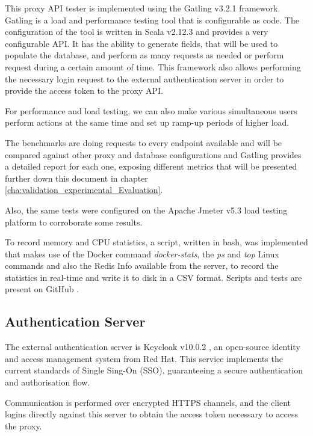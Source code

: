 This proxy \gls{API} tester is implemented using the Gatling v3.2.1 \cite{gatling:1} framework. Gatling is a load and performance testing tool that is configurable as code. The configuration of the tool is written in Scala v2.12.3 and provides a very configurable \gls{API}. It has the ability to generate fields, that will be used to populate the database, and perform as many requests as needed or perform request during a certain amount of time. This framework also allows performing the necessary login request to the external authentication server in order to provide the access token to the proxy API.

For performance and load testing, we can also make various simultaneous users perform actions at the same time and set up ramp-up periods of higher load.

The benchmarks are doing requests to every endpoint available and will be compared against other proxy and database configurations and Gatling provides a detailed report for each one, exposing different metrics that will be presented further down this document in chapter \ref{cha:validation_experimental_Evaluation}.

Also, the same tests were configured on the Apache Jmeter v5.3\cite{jmeter:1} load testing platform to corroborate some results.

To record memory and \gls{CPU} statistics, a script, written in bash, was implemented that makes use of the Docker command \textit{docker-stats}, the \textit{ps} and \textit{top} Linux commands and also the Redis Info available from the server, to record the statistics in real-time and write it to disk in a \gls{CSV} format. Scripts and tests are present on GitHub \cite{thesis-repository:client}.

\subsection{Authentication Server}
\label{ssec:implementation_authentication_server}

The external authentication server is Keycloak v10.0.2 \cite{keycloak:1}, an open-source identity and access management system from Red Hat. This service implements the current standards of Single Sing-On (SSO), guaranteeing a secure authentication and authorisation flow.

Communication is performed over encrypted \gls{HTTPS} channels, and the client logins directly against this server to obtain the access token necessary to access the proxy.

